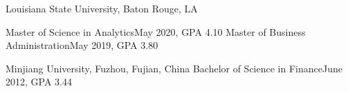 \documentclass[10pt,a4paper]{article}
\begin{document}

\spacedhrule{0em}{-1em}

%
%


\myheadedsection
{Louisiana State University, Baton Rouge, LA}
{}
{}
{}
{

  \headedsubsection
  {Master of Science in Analytics}{May 2020, GPA 4.10}{}
  \headedsubsection
  {Master of Business Administration}{May 2019, GPA 3.80}{}
}
\myheadedsection
{Minjiang University, Fuzhou, Fujian, China}
{}
{}
{
	\headedsubsection
  {Bachelor of Science in Finance}{June 2012, GPA 3.44}{}
}


\end{document}
